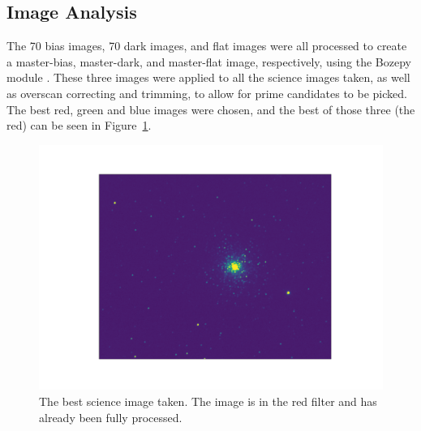 \documentclass[twoside,11pt]{article}
\begin{document}
\subsection{Image Analysis}

The 70 bias images, 70 dark images, and flat images were all processed to create a master-bias, master-dark, and master-flat image, respectively, using the Bozepy module \citep{bozepy}. These three images were applied to all the science images taken, as well as overscan correcting and trimming, to allow for prime candidates to be picked. The best red, green and blue images were chosen, and the best of those three (the red) can be seen in Figure~\ref{fig:red}.

\begin{figure}[ht]
\includegraphics[width=\textwidth]{red_pic.pdf}
\caption{The best science image taken. The image is in the red filter and has already been fully processed.}
\label{fig:red}
\end{figure}
\end{document}

